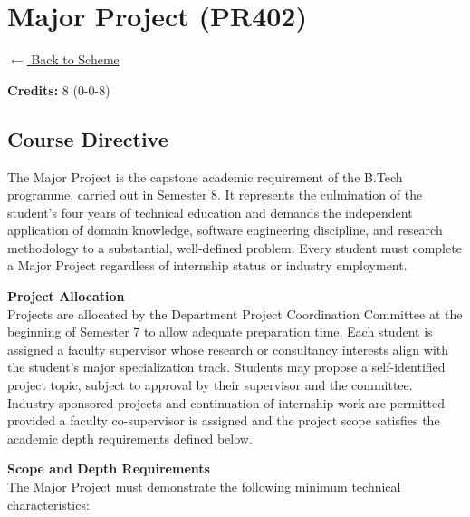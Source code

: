 \section*{Major Project (PR402)}
\label{course:PR402}

\noindent \small{\hyperref[main:scheme]{$\leftarrow$ Back to Scheme}} \vspace{0.5cm}

\noindent \textbf{Credits:} 8 (0-0-8)

\subsection*{Course Directive}
\noindent The Major Project is the capstone academic requirement of the B.Tech programme, carried out in Semester 8. It represents the culmination of the student's four years of technical education and demands the independent application of domain knowledge, software engineering discipline, and research methodology to a substantial, well-defined problem. Every student must complete a Major Project regardless of internship status or industry employment.

\vspace{0.3cm}

\noindent\textbf{Project Allocation} \\
Projects are allocated by the Department Project Coordination Committee at the beginning of Semester 7 to allow adequate preparation time. Each student is assigned a faculty supervisor whose research or consultancy interests align with the student's major specialization track. Students may propose a self-identified project topic, subject to approval by their supervisor and the committee. Industry-sponsored projects and continuation of internship work are permitted provided a faculty co-supervisor is assigned and the project scope satisfies the academic depth requirements defined below.

\vspace{0.3cm}

\noindent\textbf{Scope and Depth Requirements} \\
The Major Project must demonstrate the following minimum technical characteristics:

\vspace{0.2cm}


